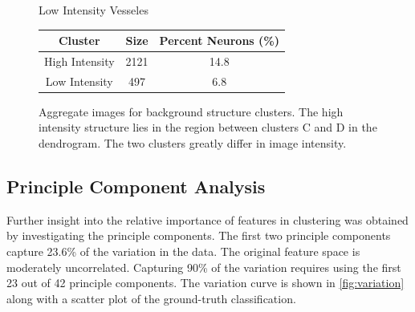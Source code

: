 \documentclass[10pt]{article}
\begin{document}
\begin{figure}[h]
\begin{minipage}{0.23\textwidth}
      \caption*{Low Intensity Vesseles}
    \end{minipage}
    \begin{minipage}{0.50\textwidth}
      \centering
      \footnotesize
      \begin{tabular}{cSS}
        \toprule
        Cluster & {Size} & {Percent Neurons (\%)} \\
        \midrule
        High Intensity & 2121 & 14.8 \\
         Low Intensity &  497 &  6.8 \\
        \bottomrule
      \end{tabular}
    \end{minipage}
    \caption{\footnotesize Aggregate images for background structure clusters. The high intensity structure lies in the region between clusters C and D in the dendrogram. The two clusters greatly differ in image intensity.}
    \label{fig:clusterdepths}
\end{figure}

\subsection{Principle Component Analysis}

Further insight into the relative importance of features in clustering was obtained by investigating the principle components.
The first two principle components capture \num{23.6}\% of the variation in the data.
The original feature space is moderately uncorrelated.
Capturing \num{90}\% of the variation requires using the first \num{23} out of \num{42} principle components.
The variation curve is shown in \cref{fig:variation} along with a scatter plot of the ground-truth classification.
\end{document}
